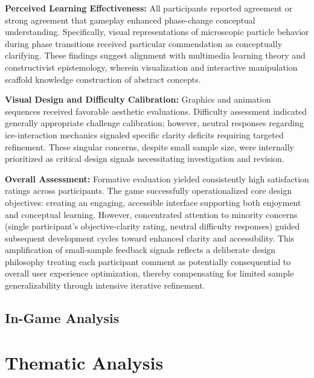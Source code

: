 \textbf{Perceived Learning Effectiveness:} All participants reported agreement or strong agreement that gameplay enhanced phase-change conceptual understanding. Specifically, visual representations of microscopic particle behavior during phase transitions received particular commendation as conceptually clarifying. These findings suggest alignment with multimedia learning theory and constructivist epistemology, wherein visualization and interactive manipulation scaffold knowledge construction of abstract concepts.

\textbf{Visual Design and Difficulty Calibration:} Graphics and animation sequences received favorable aesthetic evaluations. Difficulty assessment indicated generally appropriate challenge calibration; however, neutral responses regarding ice-interaction mechanics signaled specific clarity deficits requiring targeted refinement. These singular concerns, despite small sample size, were internally prioritized as critical design signals necessitating investigation and revision.

\textbf{Overall Assessment:} Formative evaluation yielded consistently high satisfaction ratings across participants. The game successfully operationalized core design objectives: creating an engaging, accessible interface supporting both enjoyment and conceptual learning. However, concentrated attention to minority concerns (single participant's objective-clarity rating, neutral difficulty responses) guided subsequent development cycles toward enhanced clarity and accessibility. This amplification of small-sample feedback signals reflects a deliberate design philosophy treating each participant comment as potentially consequential to overall user experience optimization, thereby compensating for limited sample generalizability through intensive iterative refinement.



\subsection{In-Game Analysis}

\section{Thematic Analysis}

